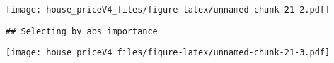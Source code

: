 \documentclass[
]{article}
\newenvironment{Shaded}{\begin{snugshade}}{\end{snugshade}}
\newcommand{\CommentTok}[1]{\textcolor[rgb]{0.56,0.35,0.01}{\textit{#1}}}
\newcommand{\DataTypeTok}[1]{\textcolor[rgb]{0.13,0.29,0.53}{#1}}
\newcommand{\DecValTok}[1]{\textcolor[rgb]{0.00,0.00,0.81}{#1}}
\newcommand{\FloatTok}[1]{\textcolor[rgb]{0.00,0.00,0.81}{#1}}
\newcommand{\KeywordTok}[1]{\textcolor[rgb]{0.13,0.29,0.53}{\textbf{#1}}}
\newcommand{\NormalTok}[1]{#1}
\newcommand{\OperatorTok}[1]{\textcolor[rgb]{0.81,0.36,0.00}{\textbf{#1}}}
\newcommand{\StringTok}[1]{\textcolor[rgb]{0.31,0.60,0.02}{#1}}
\begin{document}
\texttt{[image: house\_priceV4\_files/figure-latex/unnamed-chunk-21-2.pdf]}

\begin{Shaded}
\end{Shaded}

\begin{verbatim}
## Selecting by abs_importance
\end{verbatim}

\texttt{[image: house\_priceV4\_files/figure-latex/unnamed-chunk-21-3.pdf]}

\begin{Shaded}
\end{Shaded}
\end{document}

